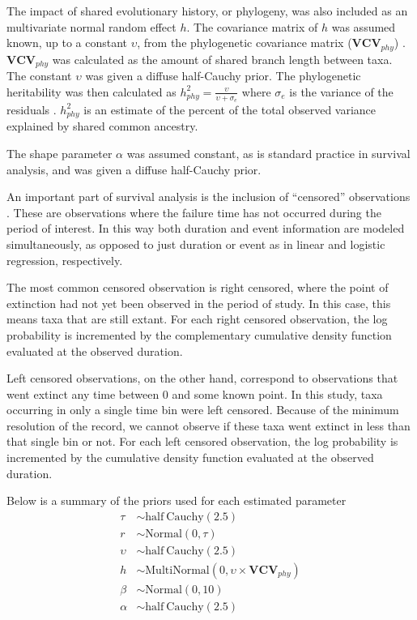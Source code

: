 \documentclass[12pt,letterpaper]{article}
\begin{document}
The impact of shared evolutionary history, or phylogeny, was also included as an multivariate normal random effect \(h\). The covariance matrix of \(h\) was assumed known, up to a constant \(\upsilon\), from the phylogenetic covariance matrix (\(\mathbf{VCV}_{phy}\)) \citep{Lynch1991,Housworth2004}. \(\mathbf{VCV}_{phy}\) was calculated as the amount of shared branch length between taxa. The constant \(\upsilon\) was given a diffuse half-Cauchy prior. The phylogenetic heritability was then calculated as \(h_{phy}^{2} = \frac{\upsilon}{\upsilon + \sigma_{e}}\) where \(\sigma_{e}\) is the variance of the residuals \citep{Housworth2004}. \(h_{phy}^{2}\) is an estimate of the percent of the total observed variance explained by shared common ancestry.

The shape parameter \(\alpha\) was assumed constant, as is standard practice in survival analysis, and was given a diffuse half-Cauchy prior. 


An important part of survival analysis is the inclusion of ``censored'' observations \citep{Ibrahim2001,Kleinbaum2005}. These are observations where the failure time has not occurred during the period of interest. In this way both duration and event information are modeled simultaneously, as opposed to just duration or event as in linear and logistic regression, respectively. 

The most common censored observation is right censored, where the point of extinction had not yet been observed in the period of study. In this case, this means taxa that are still extant. For each right censored observation, the log probability is incremented by the complementary cumulative density function evaluated at the observed duration.

Left censored observations, on the other hand, correspond to observations that went extinct any time between 0 and some known point. In this study, taxa occurring in only a single time bin were left censored. Because of the minimum resolution of the record, we cannot observe if these taxa went extinct in less than that single bin or not. For each left censored observation, the log probability is incremented by the cumulative density function evaluated at the observed duration.

Below is a summary of the priors used for each estimated parameter 
\begin{align*}
  \tau &\sim \mathrm{half\ Cauchy}(2.5) \\
  r &\sim \mathrm{Normal}(0, \tau) \\
  \upsilon &\sim \mathrm{half\ Cauchy}(2.5) \\
  h &\sim \mathrm{MultiNormal}(0, \upsilon \times \mathbf{VCV}_{phy}) \\
  \beta &\sim \mathrm{Normal}(0, 10) \\
  \alpha &\sim \mathrm{half\ Cauchy}(2.5)
\end{align*}
\end{document}
